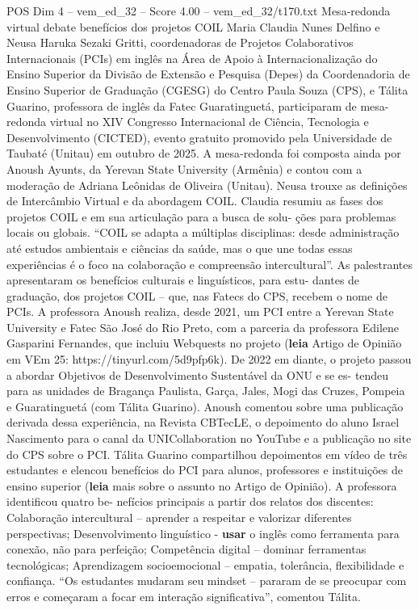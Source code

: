 \begin{textsample}{POS Dim 4 – vem\_ed\_32 – Score 4.00 – vem\_ed\_32/t170.txt}  \label{ex:f4_pos_033}
Mesa-redonda virtual debate benefícios dos projetos COIL Maria Claudia Nunes Delfino e Neusa Haruka Sezaki Gritti, coordenadoras de Projetos Colaborativos Internacionais (PCIs) em inglês na Área de Apoio à Internacionalização do Ensino Superior da Divisão de Extensão e Pesquisa (Depes) da Coordenadoria de Ensino Superior de Graduação (CGESG) do Centro Paula Souza (CPS), e Tálita Guarino, professora de inglês da Fatec Guaratinguetá, participaram de mesa-redonda virtual no XIV Congresso Internacional de Ciência, Tecnologia e Desenvolvimento (CICTED), evento gratuito promovido pela Universidade de Taubaté (Unitau) em outubro de 2025.
A mesa-redonda foi composta ainda por Anoush Ayunts, da Yerevan State University (Armênia) e contou com a moderação de Adriana Leônidas de Oliveira (Unitau).
Neusa trouxe as definições de Intercâmbio Virtual e da abordagem COIL.
Claudia resumiu as fases dos projetos COIL e em sua articulação para a busca de solu- ções para problemas locais ou globais. “COIL se adapta a múltiplas disciplinas: desde administração até estudos ambientais e ciências da saúde, mas o que une todas essas experiências é o foco na colaboração e compreensão intercultural”.
As palestrantes apresentaram os benefícios culturais e linguísticos, para estu- dantes de graduação, dos projetos COIL – que, nas Fatecs do CPS, recebem o nome de PCIs.
A professora Anoush realiza, desde 2021, um PCI entre a Yerevan State University e Fatec São José do Rio Preto, com a parceria da professora Edilene Gasparini Fernandes, que incluiu Webquests no projeto (\textbf{leia} Artigo de Opinião em VEm 25: https://tinyurl.com/5d9pfp6k).
De 2022 em diante, o projeto passou a abordar Objetivos de Desenvolvimento Sustentável da ONU e se es- tendeu para as unidades de Bragança Paulista, Garça, Jales, Mogi das Cruzes, Pompeia e Guaratinguetá (com Tálita Guarino).
Anoush comentou sobre uma publicação derivada dessa experiência, na Revista CBTecLE, o depoimento do aluno Israel Nascimento para o canal da UNICollaboration no YouTube e a publicação no site do CPS sobre o PCI.
Tálita Guarino compartilhou depoimentos em vídeo de três estudantes e elencou benefícios do PCI para alunos, professores e instituições de ensino superior (\textbf{leia} mais sobre o assunto no Artigo de Opinião).
A professora identificou quatro be- nefícios principais a partir dos relatos dos discentes: Colaboração intercultural – aprender a respeitar e valorizar diferentes perspectivas; Desenvolvimento linguístico - \textbf{usar} o inglês como ferramenta para conexão, não para perfeição; Competência digital – dominar ferramentas tecnológicas; Aprendizagem socioemocional – empatia, tolerância, flexibilidade e confiança. “Os estudantes mudaram seu mindset – pararam de se preocupar com erros e começaram a focar em interação significativa”, comentou Tálita.

\end{textsample}
